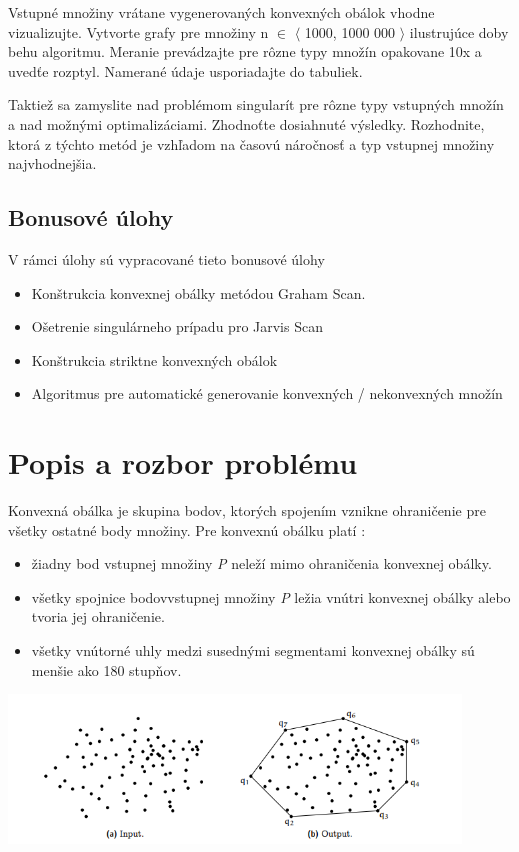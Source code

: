 \documentclass[12pt]{article}
\begin{document}
Vstupné množiny vrátane vygenerovaných konvexných obálok vhodne vizualizujte. Vytvorte grafy pre množiny n $\in$ $\langle$ 1000, 1000 000 $\rangle$ ilustrujúce doby behu algoritmu. Meranie prevádzajte pre rôzne typy množín opakovane 10x a uvedťe rozptyl. Namerané údaje usporiadajte do tabuliek.

Taktiež sa zamyslite nad problémom singularít pre rôzne typy vstupných množín a nad možnými optimalizáciami. Zhodnoťte dosiahnuté výsledky. Rozhodnite, ktorá z týchto metód je vzhľadom na časovú náročnosť a typ vstupnej množiny najvhodnejšia.

\subsection{Bonusové úlohy}
V rámci úlohy sú vypracované tieto bonusové úlohy

\begin{itemize}
\item Konštrukcia konvexnej obálky metódou Graham Scan.
\item Ošetrenie singulárneho prípadu pro Jarvis Scan
\item Konštrukcia striktne konvexných obálok
\item Algoritmus pre automatické generovanie konvexných / nekonvexných množín

\end{itemize}
\clearpage 
\section{Popis a rozbor problému}
Konvexná obálka je skupina bodov, ktorých spojením vznikne ohraničenie pre všetky ostatné body množiny. Pre konvexnú obálku platí : 

\begin{itemize}
\item žiadny bod vstupnej množiny \textit{P} neleží mimo ohraničenia konvexnej obálky.
\item všetky spojnice bodovvstupnej množiny \textit{P} ležia vnútri konvexnej obálky alebo tvoria jej ohraničenie.
\item všetky vnútorné uhly medzi susednými segmentami konvexnej obálky sú menšie ako 180 stupňov.
\end{itemize}

\begin{center}
   \includegraphics[width=12cm]{./img/ch_obrazok1.png}
\end{center}
\end{document}
